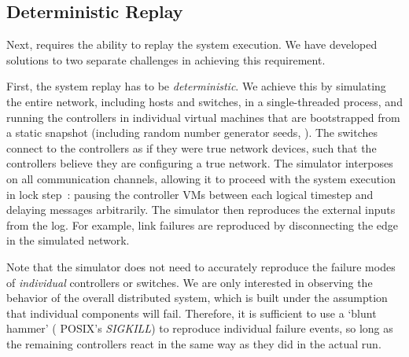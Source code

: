 {



\subsection{Deterministic Replay}

Next, \simulator{} requires the ability to replay the system execution.
We have developed solutions to two separate challenges in achieving this requirement.

First, the system replay has to be {\em deterministic}.
We achieve this by simulating the entire network, including hosts and
switches, in a single-threaded process, and running the controllers in
individual virtual machines that are
bootstrapped from a static snapshot (including random number generator
seeds, \etc{}). The switches connect to the controllers as if they were true
network devices, such that the controllers believe they are configuring a true
network. The simulator interposes on all communication channels,
allowing it to proceed with the system execution in
lock step~\cite{Dunlap:2002:REI:844128.844148}:
pausing the controller VMs between each logical timestep and delaying messages
arbitrarily. The simulator then reproduces the external inputs from the log.
For example, link failures are reproduced by disconnecting the edge in
the simulated network.

Note that the simulator does not need
to accurately reproduce the failure modes of {\em individual} controllers or switches.
We are only interested in observing the behavior of the overall distributed system, which is
built under the assumption that individual components will fail.
Therefore, it is sufficient to use a `blunt hammer' (\eg{} POSIX's {\em SIGKILL}) to reproduce individual
failure events, so long as the remaining controllers react in the same
way as they did in the actual run.

}
